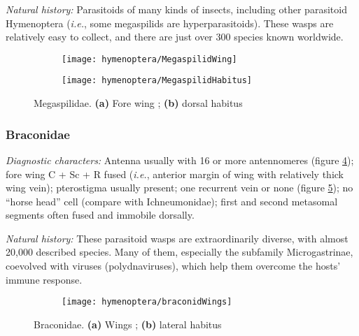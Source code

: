 \noindent{}\textit{Natural history:} Parasitoids of many kinds of insects, including other parasitoid Hymenoptera (\textit{i.e.}, some megaspilids are hyperparasitoids). These wasps are relatively easy to collect, and there are just over 300 species known worldwide.

\begin{figure}[ht!]
  \centering
\begin{subfigure}[ht!]{0.45\textwidth}
    \texttt{[image: hymenoptera/MegaspilidWing]}
  \caption{}
  \label{fig:megaspilid1}
\end{subfigure}
    \hfill
\begin{subfigure}[ht!]{0.38\textwidth}
    \texttt{[image: hymenoptera/MegaspilidHabitus]}
  \caption{}
  \label{fig:megaspilid2}
\end{subfigure}
    \caption{Megaspilidae. \textbf{(a)} Fore wing \citep[][pg. 566]{goulet1993hymenoptera}; \textbf{(b)} dorsal habitus \citep[][Fig. 209]{goulet1993hymenoptera}}\label{fig:megaspilid}
\end{figure}

\subsubsection{Braconidae}
\noindent{}\textit{Diagnostic characters:} Antenna usually with 16 or more antennomeres (figure \ref{fig:braconid1}); fore wing C + Sc + R fused (\textit{i.e.}, anterior margin of wing with relatively thick wing vein); pterostigma usually present; one recurrent vein or none (figure \ref{fig:braconid2}); no ``horse head'' cell (compare with Ichneumonidae); first and second metasomal segments often fused and immobile dorsally.\vspace{3mm}

\noindent{}\textit{Natural history:} These parasitoid wasps are extraordinarily diverse, with almost 20,000 described species. Many of them, especially the subfamily Microgastrinae, coevolved with viruses (polydnaviruses), which help them overcome the hosts' immune response.

\begin{figure}[ht!]
    \centering
    \begin{subfigure}[ht!]{0.45\textwidth}
        \texttt{[image: hymenoptera/braconidWings]}
        \caption{}
        \label{fig:braconid1}
    \end{subfigure}
    \hfill
    \begin{subfigure}[ht!]{0.34\textwidth}
        \caption{}
        \label{fig:braconid2}
    \end{subfigure}
    \caption{Braconidae. \textbf{(a)} Wings \citep[redrawn from][Fig. 56]{comstock1918wings}; \textbf{(b)} lateral habitus \citep[][Fig. 138]{goulet1993hymenoptera}}\label{fig:braconids}
\end{figure}

